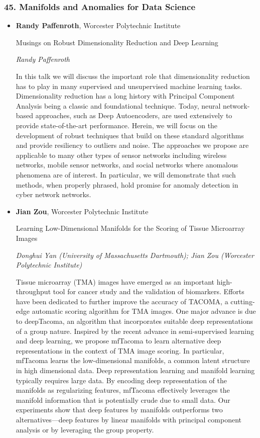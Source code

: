 \subsubsection*{45. Manifolds and Anomalies for Data Science}

\begin{itemize}
\item \textbf{Randy Paffenroth}, Worcester Polytechnic Institute

Musings on Robust Dimensionality Reduction and Deep Learning

\emph{\footnotesize Randy Paffenroth}

In this talk we will discuss the important role that dimensionality reduction has to play in many supervised and unsupervised machine learning tasks.  Dimensionality reduction has a long history with Principal Component Analysis being a classic and foundational technique.   Today, neural network-based approaches, such as Deep Autoencoders, are used extensively to provide state-of-the-art performance.   Herein, we will focus on the development of robust techniques that build on these standard algorithms and provide resiliency to outliers and noise.  The approaches we propose are applicable to many other types of sensor networks including wireless networks, mobile sensor networks, and social networks where anomalous phenomena are of interest.  In particular, we will demonstrate that such methods, when properly phrased, hold promise for anomaly detection in cyber network networks.

\item \textbf{Jian Zou}, Worcester Polytechnic Institute

Learning Low-Dimensional Manifolds for the Scoring of Tissue Microarray Images

\emph{\footnotesize Donghui Yan (University of Massachusetts Dartmouth); Jian Zou (Worcester Polytechnic Institute)}

Tissue microarray (TMA) images have emerged as an important high-throughput tool for cancer study and the validation of biomarkers. Efforts have been dedicated to further improve the accuracy of TACOMA, a cutting-edge automatic scoring algorithm for TMA images. One major advance is due to deepTacoma, an algorithm that incorporates suitable deep representations of a group nature. Inspired by the recent advance in semi-supervised learning and deep learning, we propose mfTacoma to learn alternative deep representations in the context of TMA image scoring. In particular, mfTacoma learns the low-dimensional manifolds, a common latent structure in high dimensional data. Deep representation learning and manifold learning typically requires large data. By encoding deep representation of the manifolds as regularizing features, mfTacoma effectively leverages the manifold information that is potentially crude due to small data. Our experiments show that deep features by manifolds outperforms two alternatives---deep features by linear manifolds with principal component analysis or by leveraging the group property.


\end{itemize}
